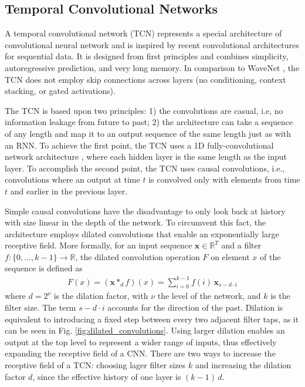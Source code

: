 \documentclass{scrartcl}
\begin{document}






\subsection{Temporal Convolutional Networks}

A temporal convolutional network (TCN) \cite{Bai2018} represents a special architecture of convolutional neural network and is inspired by recent convolutional architectures for sequential data. It is designed from first principles and combines simplicity, autoregressive prediction, and very long memory. In comparison to WaveNet \cite{Oord2016}, the TCN does not employ skip connections across layers (no conditioning, context stacking, or gated activations).

The TCN is based upon two principles: 1) the convolutions are casual, i.e, no information leakage from future to past; 2) the architecture can take a sequence of any length and map it to an output sequence of the same length just as with an RNN. To achieve the first point, the TCN uses a 1D fully-convolutional network architecture \cite{Long2015}, where each hidden layer is the same length as the input layer. To accomplish the second point, the TCN uses causal convolutions, i.e., convolutions where an output at time $t$ is convolved only with elements from time $t$ and earlier in the previous layer.

Simple causal convolutions have the disadvantage to only look back at history with size linear in the depth of the network. To circumvent this fact, the architecture employs dilated convolutions that enable an exponentially large receptive field. More formally, for an input sequence $\mathbf x \in \mathbb R^T$ and a filter $f:\{ 0, \dots, k-1\} \rightarrow \mathbb R$, the dilated convolution operation $F$ on element $x$ of the sequence is defined as
\begin{align}
F(x) = (\mathbf x *_d f)(x) = \sum_{i=0}^{k-1} f(i) \, \mathbf x_{s-d\cdot i}
\end{align}
where $d = 2^\nu$ is the dilation factor, with $\nu$ the level of the network, and $k$ is the filter size. The term $s-d\cdot i$ accounts for the direction of the past. Dilation is equivalent to introducing a fixed  step between every two adjacent filter taps, as it can be seen in Fig. \ref{fig:dilated_convolutions}. Using larger dilation enables an output at the top level to represent a wider range of inputs, thus effectively expanding the receptive field of a CNN. There are two ways to increase the receptive field of a TCN: choosing lager filter sizes $k$ and increasing the dilation factor $d$, since the effective history of one layer is $(k-1) \, d$. 
\end{document}
